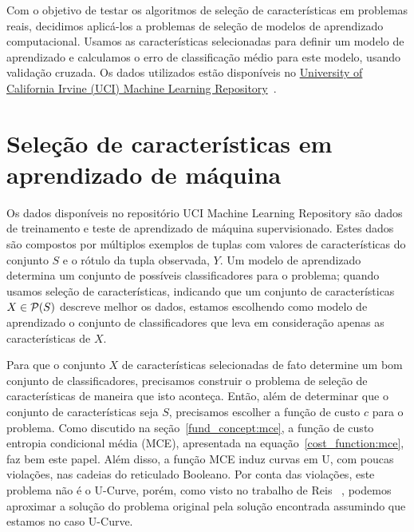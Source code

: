 


Com o objetivo de testar os algoritmos de seleção de características
em problemas reais, decidimos aplicá-los a problemas de seleção de 
modelos de aprendizado computacional. Usamos as características 
selecionadas para definir um modelo de aprendizado e calculamos o erro
de classificação médio para este modelo, usando validação cruzada. Os
dados utilizados estão disponíveis no 
\href{https://archive.ics.uci.edu/ml/index.php}{University of California Irvine (UCI) Machine Learning 
Repository}~\cite{Lic13}.

\section{Seleção de características em aprendizado de máquina}
Os dados disponíveis no repositório UCI Machine Learning Repository
são dados de treinamento e teste de aprendizado de máquina 
supervisionado. Estes dados são compostos por múltiplos exemplos de 
tuplas com valores de características do conjunto $S$ e o rótulo da 
tupla observada, $Y$. Um modelo de aprendizado determina um conjunto de 
possíveis classificadores para o problema; quando usamos seleção de 
características, indicando que um conjunto de características 
$X \in \mathcal{P}(S)$ descreve melhor os dados, estamos escolhendo como 
modelo de aprendizado o conjunto de classificadores que leva em 
consideração apenas as características de $X$.

Para que o conjunto $X$ de características selecionadas de fato 
determine um bom conjunto de classificadores, precisamos construir
o problema de seleção de características de maneira que isto aconteça.
Então, além de determinar que o conjunto de características seja $S$,
precisamos escolher a função de custo $c$ para o problema. 
Como discutido na seção~\ref{fund_concept:mce}, a função de custo
entropia condicional média (MCE), apresentada na equação~\ref{cost_function:mce}, faz bem este papel. Além disso, a 
função MCE induz curvas em U, com poucas violações, nas cadeias do 
reticulado Booleano. Por conta das violações, este problema não é o
U-Curve, porém, como visto no trabalho de Reis ~\cite{Rei12}, podemos 
aproximar a solução do problema original pela solução encontrada 
assumindo que estamos no caso U-Curve.

